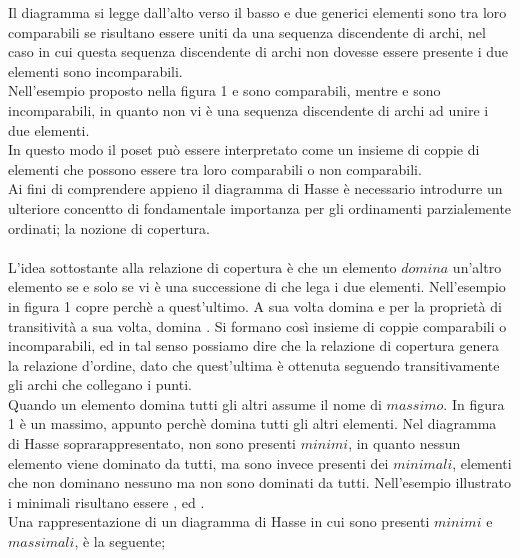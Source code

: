 \documentclass[12pt]{article}
\begin{document}
Il diagramma si legge dall'alto verso il basso e due generici elementi sono tra loro comparabili se 
risultano essere uniti da una sequenza discendente di archi, nel caso in cui questa sequenza discendente di 
archi non dovesse essere presente i due elementi sono incomparabili. \\
Nell'esempio proposto nella figura 1  e  sono comparabili, mentre  e  sono incomparabili, 
in quanto non vi è una sequenza discendente di archi ad unire i due elementi. \\
In questo modo il poset può essere interpretato come un insieme di coppie di elementi che possono
essere tra loro comparabili o non comparabili. \\
Ai fini di comprendere appieno il diagramma di Hasse è necessario introdurre un ulteriore concentto
di fondamentale importanza per gli ordinamenti parzialemente ordinati; la nozione di copertura. \\
\\
L'idea sottostante alla relazione di copertura è che un elemento $\textit{domina}$ un'altro elemento se e solo se vi è
una successione di  che lega i due elementi. Nell'esempio in figura 1  copre  perchè
 a quest'ultimo. A sua volta  domina  e per la proprietà di transitività a sua volta, 
domina . Si formano così insieme di coppie comparabili o incomparabili, ed in tal senso possiamo dire che la relazione 
di copertura genera la relazione d'ordine, dato che quest'ultima è ottenuta seguendo transitivamente gli archi che collegano i punti. \\
Quando un elemento domina tutti gli altri assume il nome di $\textit{massimo}$. In figura 1  è un massimo, appunto perchè
domina tutti gli altri elementi. Nel diagramma di Hasse soprarappresentato, non sono presenti $\textit{minimi}$, in quanto nessun elemento viene dominato
da tutti, ma sono invece presenti dei $\textit{minimali}$, elementi che non dominano nessuno ma non sono dominati da tutti. 
Nell'esempio illustrato i minimali risultano essere ,  ed . \\
Una rappresentazione di un diagramma di Hasse in cui sono presenti $\textit{minimi}$ e $\textit{massimali}$, è la seguente;\\
\end{document}

